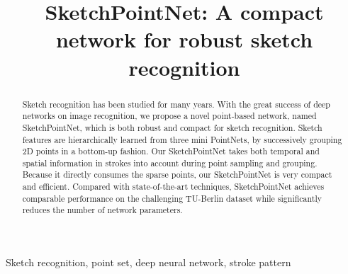 \documentclass{article}
\title{SketchPointNet: A compact network for robust sketch recognition}
\begin{document}
%
\maketitle
%
\begin{abstract}
Sketch recognition has been studied for many years. 
With the great success of deep networks on image recognition, we propose a novel point-based network, named SketchPointNet, which is both robust and compact for sketch recognition. 
%
Sketch features are hierarchically learned from three mini PointNets, by successively grouping 2D points in a bottom-up fashion. 
%
Our SketchPointNet takes both temporal and spatial information in strokes into account during point sampling and grouping.
%
Because it directly consumes the sparse points, our SketchPointNet is very compact and efficient. 
%
Compared with state-of-the-art techniques, SketchPointNet achieves comparable performance on the challenging TU-Berlin dataset while significantly reduces the number of network parameters. 

 
\end{abstract}

\begin{keywords}
Sketch recognition, point set, deep neural network, stroke pattern 
\end{keywords}







\end{document}

